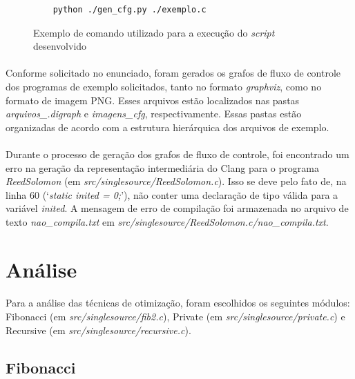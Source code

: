 \documentclass[12pt]{article}
\begin{document}
\begin{figure}
    \centering
    \begin{verbatim}
    python ./gen_cfg.py ./exemplo.c
\end{verbatim}
    \caption{Exemplo de comando utilizado para a execução do \textit{script} desenvolvido}
\end{figure}

\paragraph{}Conforme solicitado no enunciado, foram gerados os grafos de fluxo de controle dos programas de exemplo solicitados, tanto no formato \textit{graphviz}, como no formato de imagem PNG. Esses arquivos estão localizados nas pastas \textit{arquivos\_.digraph} e \textit{imagens\_cfg}, respectivamente. Essas pastas estão organizadas de acordo com a estrutura hierárquica dos arquivos de exemplo.

\paragraph{}Durante o processo de geração dos grafos de fluxo de controle, foi encontrado um erro na geração da representação intermediária do Clang para o programa \textit{ReedSolomon} (em \textit{src/singlesource/ReedSolomon.c}). Isso se deve pelo fato de, na linha 60 (‘\textit{static inited = 0;}’), não conter uma declaração de tipo válida para a variável \textit{inited}. A mensagem de erro de compilação foi armazenada no arquivo de texto \textit{nao\_compila.txt} em \textit{src/singlesource/ReedSolomon.c/nao\_compila.txt}.

\FloatBarrier

\section{Análise}

\paragraph{}Para a análise das técnicas de otimização, foram escolhidos os seguintes módulos: Fibonacci (em \textit{src/singlesource/fib2.c}), Private (em \textit{src/singlesource/private.c}) e Recursive (em \textit{src/singlesource/recursive.c}).

\subsection{Fibonacci}
\end{document}
